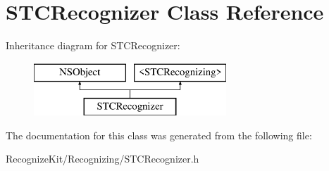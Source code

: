 \hypertarget{interface_s_t_c_recognizer}{}\section{S\+T\+C\+Recognizer Class Reference}
\label{interface_s_t_c_recognizer}
Inheritance diagram for S\+T\+C\+Recognizer\+:\begin{figure}[H]
\begin{center}
\leavevmode
\includegraphics[height=2.000000cm]{interface_s_t_c_recognizer}
\end{center}
\end{figure}


The documentation for this class was generated from the following file\+:\begin{DoxyCompactItemize}
\item 
Recognize\+Kit/\+Recognizing/S\+T\+C\+Recognizer.\+h\end{DoxyCompactItemize}
